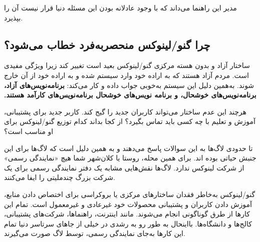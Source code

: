 \begin{note}
مدیر این راهنما می‌داند که با وجود عادلانه بودن این مسئله دنیا قرار نیست آن را بپذیرد.
\end{note}

\subsection{چرا گنو/لینوکس منحصربه‌فرد خطاب می‌شود؟}

ساختار آزاد و بدون هسته مرکزی گنو/لینوکس بعید است تغییر کند زیرا ویژگی مفیدی است.
مردم آزاد هستند که به اراده خود وارد سیستم شده و به اراده خود از آن خارج شوند.
به‌همین دلیل این سیستم ‫به‌خوبی جواب داده و کار می‌کند:
{\bfseries
برنامه‌نویس‌های آزاد، برنامه‌نویس‌های خوشحال، و برنامه نویس‌های خوشحال برنامه‌نویس‌های کارآمد هستند.
}

هرچند این عدم ساختار می‌تواند کاربران جدید را گیج کند.
کاربر جدید برای پشتیبانی، آموزش و تعلیم با چه کسی باید تماس بگیرد؟
از کجا بداند کدام توزیع گنو/لینوکس برای او مناسب است؟

تا حدودی لاگ‌ها به این سوالات پاسخ می‌دهند و به همین دلیل است که لاگ‌ها برای این جنبش حیاتی بوده اند.
برای همین محله، روستا یا کلان‌شهر شما هیچ «نمایندگی رسمی» از شرکت لینوکس ندارد.
لاگ‌ها نقش‌هایی مشابه یک دفتر نمایندگی رسمی برای یک شرکت بزرگ چندملیتی را ایفا می‌کنند.

گنو/لینوکس به‌خاطر فقدان ساختار‌های مرکزی یا بروکراسی برای اختصاص دادن منابع،
آموزش دادن کاربران و پشتیبانی محصولات خود غیرعادی و غیرمعمول است. تمام این کارها
از طرق گوناگونی انجام می‌شوند. مانند اینترنت، راهنماها،
شرکت‌های پشتیبانی، کالج‌ها و دانشگاه‌ها. بااینحال به طور رو به رشدی در خیلی از جاهای
سرتاسر دنیا تمام این کارها به‌جای نمایندگی رسمی، توسط لاگ صورت می‌گیرند.

